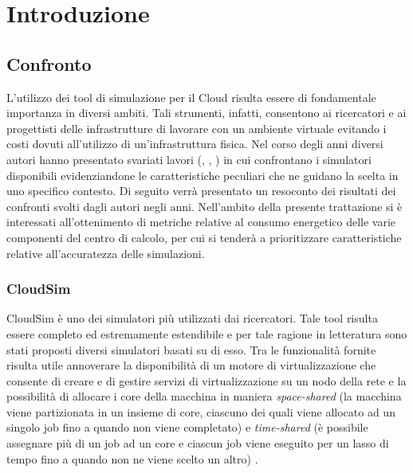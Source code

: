 
\chapter{Introduzione}

\begin{citazione}
\end{citazione}
\newpage

\section{Confronto} { 
L'utilizzo dei tool di simulazione per il Cloud risulta essere di fondamentale importanza in diversi ambiti. Tali strumenti, infatti, consentono ai ricercatori e ai progettisti delle infrastrutture di lavorare con un ambiente virtuale evitando i costi dovuti all'utilizzo di un'infrastruttura fisica. Nel corso degli anni diversi autori hanno presentato svariati lavori (\cite{mansouri2020cloud}, \cite{suryateja2016comparative}, \cite{abreu2020comparative}) in cui confrontano i simulatori disponibili evidenziandone le caratteristiche peculiari che ne guidano la scelta in uno specifico contesto. Di seguito verrà presentato un resoconto dei risultati dei confronti svolti dagli autori negli anni. 
Nell'ambito della presente trattazione si è interessati all'ottenimento di metriche relative al consumo energetico delle varie componenti del centro di calcolo, per cui si tenderà a prioritizzare caratteristiche relative all'accuratezza delle simulazioni.
\subsection{CloudSim}
CloudSim \cite{calheiros2011cloudsim} è uno dei simulatori più utilizzati dai ricercatori. Tale tool risulta essere completo ed estremamente estendibile e per tale ragione in letteratura sono stati proposti diversi simulatori basati su di esso. Tra le funzionalità fornite risulta utile annoverare la disponibilità di un motore di virtualizzazione che consente di creare e di gestire servizi di virtualizzazione su un nodo della rete e la possibilità di allocare i core della macchina in maniera \emph{space-shared} (la macchina viene partizionata in un insieme di core, ciascuno dei quali viene allocato ad un singolo job fino a quando non viene completato) e \emph{time-shared} (è possibile assegnare più di un job ad un core e ciascun job viene eseguito per un lasso di tempo fino a quando non ne viene scelto un altro) \cite{mansouri2020cloud}. 
}
